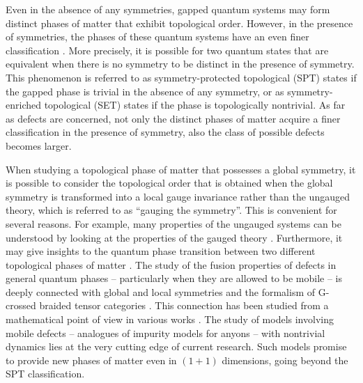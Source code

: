 Even in the absence of any symmetries, gapped quantum systems may form distinct phases of matter that exhibit topological order. However, in the presence of symmetries, the phases of these quantum systems have an even finer classification \cite{Wen2002,SRFL08,Kitaev2009,FK10,CGW11,FK11,TPB11,LS12,LV12,FM13,EH13,NCMT14,WPS14,K14,F14,EN14,MFCV15,BRSX15,LV16}. More precisely, it is possible for two quantum states that are equivalent when there is no symmetry to be distinct in the presence of symmetry. This phenomenon is referred to as symmetry-protected topological (SPT) states \cite{CGLW13,Yoshida2015,Yoshida2017} if the gapped phase is trivial in the absence of any symmetry, or as symmetry-enriched topological (SET) states \cite{ENO10,MR13,WBV17} if the phase is topologically nontrivial. As far as defects are concerned, not only the distinct phases of matter acquire a finer classification in the presence of symmetry, also the class of possible defects becomes larger. 

When studying a topological phase of matter that possesses a global symmetry, it is possible to consider the topological order that is obtained when the global symmetry is transformed into a local gauge invariance rather than the ungauged theory, which is referred to as ``gauging the symmetry''. This is convenient for several reasons. For example, many properties of the ungauged systems can be understood by looking at the properties of the gauged theory \cite{LG12,HW12,Swingle2014,CG14}. Furthermore, it may give insights to the quantum phase transition between two different topological phases of matter \cite{BS09,BW10,BW11,BSS12}. 
The study of the fusion properties of defects in general quantum phases -- particularly when they are allowed to be mobile -- is deeply connected with global and local symmetries and the formalism of G-crossed braided tensor categories \cite{BBCW14}. This connection has been studied from a mathematical point of view in various works \cite{T00,ENO10,Turaev2010,CGPW16,EMJP18,CSZW18,D19,BJ19}. The study of models involving mobile defects -- analogues of impurity models for anyons -- with nontrivial dynamics lies at the very cutting edge of current research. Such models promise to provide new phases of matter even in $(1+1)$ dimensions, going beyond the SPT classification.

